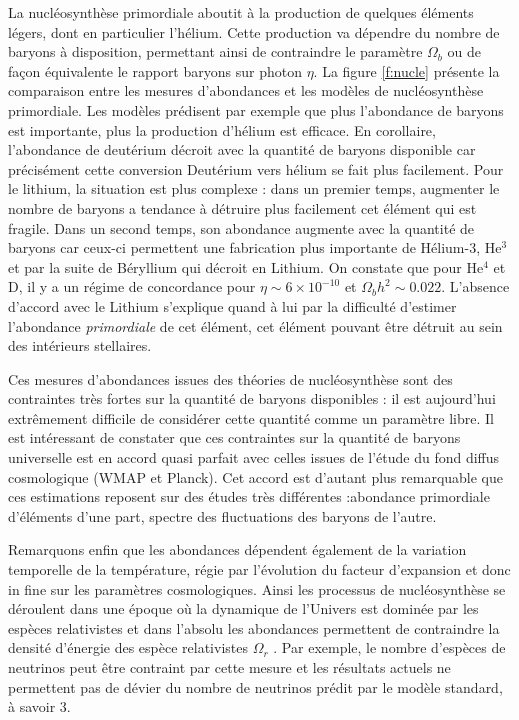 La nucléosynthèse primordiale aboutit à la production de quelques éléments légers, dont en particulier l'hélium. Cette production va dépendre du nombre de baryons à disposition, permettant ainsi de contraindre le paramètre $\Omega_b$ ou de façon équivalente le rapport baryons sur photon $\eta$. La figure \ref{f:nucle} présente la comparaison entre les mesures d'abondances et les modèles de nucléosynthèse primordiale. Les modèles prédisent par exemple que plus l'abondance de baryons est importante, plus la production d'hélium est efficace. En corollaire, l'abondance de deutérium décroit avec la quantité de baryons disponible car précisément cette conversion Deutérium vers hélium se fait plus facilement. Pour le lithium, la situation est plus complexe : dans un premier temps, augmenter le nombre de baryons a tendance à détruire plus facilement cet élément qui est fragile. Dans un second temps, son abondance augmente avec la quantité de baryons car ceux-ci permettent une fabrication plus importante de Hélium-3, He$^3$ et par la suite de Béryllium qui décroit en Lithium. On constate que pour He$^4$ et D, il y a un régime de concordance pour $\eta \sim 6\times 10^{-10}$ et $\Omega_b h^2\sim 0.022$. L'absence d'accord avec le Lithium s'explique quand à lui par la difficulté d'estimer l'abondance \textit{primordiale} de cet élément, cet élément pouvant être détruit au sein des intérieurs stellaires. 

Ces mesures d'abondances issues des théories de nucléosynthèse sont des contraintes très fortes sur la quantité de baryons disponibles : il est aujourd'hui extrêmement difficile de considérer cette quantité comme un paramètre libre. Il est intéressant de constater que ces contraintes sur la quantité de baryons universelle est en accord quasi parfait avec celles issues de l'étude du fond diffus cosmologique (WMAP et Planck). Cet accord est d'autant plus remarquable que ces estimations reposent sur des études très différentes :abondance primordiale d'éléments d'une part, spectre des fluctuations des baryons de l'autre.

Remarquons enfin que les abondances dépendent également de la variation temporelle de la température, régie par l'évolution du facteur d'expansion et donc in fine sur les paramètres cosmologiques. Ainsi les processus de nucléosynthèse se déroulent dans une époque où la dynamique de l'Univers est dominée par les espèces relativistes et dans l'absolu les abondances permettent de contraindre la densité d'énergie des espèce relativistes $\Omega_r$ . Par exemple, le nombre d'espèces de neutrinos peut être contraint par cette mesure et les résultats actuels ne permettent pas de dévier du nombre de neutrinos prédit par le modèle standard, à savoir 3.


